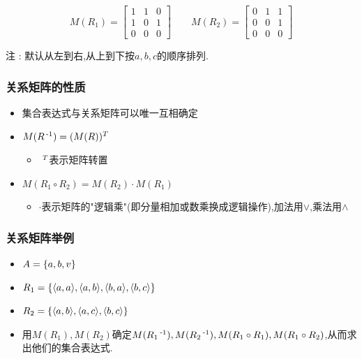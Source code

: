 {{{{    $$
      M(R_1) = \begin{bmatrix}
        1 & 1 & 0 \\
        1 & 0 & 1 \\
        0 & 0 & 0
      \end{bmatrix}
      \qquad
      M(R_2) = \begin{bmatrix}
        0 & 1 & 1 \\
        0 & 0 & 1 \\
        0 & 0 & 0
      \end{bmatrix}
    $$

    注 : 默认从左到右,从上到下按$a,b,c$的顺序排列.
  }%

  \subsubsection{关系矩阵的性质}{
    \begin{itemize}
      \item 集合表达式与关系矩阵可以唯一互相确定
      \item $M(R\operatorname{^{-1}}) = (M(R))^T$\begin{itemize}
              \item $~^T$表示矩阵转置
            \end{itemize}
      \item $M(R_1 \circ R_2) = M(R_2) \cdot M(R_1)$\begin{itemize}
              \item $\cdot$表示矩阵的"逻辑乘"(即分量相加或数乘换成逻辑操作),加法用$\lor$,乘法用$\land$
            \end{itemize}
    \end{itemize}
  }%

  \subsubsection{关系矩阵举例}{
    \begin{itemize}
      \item $A = \left\{ a,b,v \right\}$
      \item $R_1 = \left\{ \langle a,a\rangle,\langle a,b\rangle,\langle b,a\rangle,\langle b,c\rangle \right\}$
      \item $R_2 = \left\{ \langle a,b\rangle,\langle a,c\rangle,\langle b,c\rangle \right\}$
      \item 用$M(R_1),M(R_2)$确定$M(R_1\operatorname{^{-1}}),M(R_2\operatorname{^{-1}}),M(R_1 \circ R_1),M(R_1 \circ R_2)$,从而求出他们的集合表达式.
    \end{itemize}

}}}}
